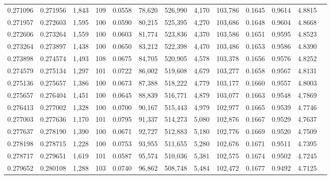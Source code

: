 \begin{tabular}{rrrrrrrrrrrrr}
0.271096 & 0.271956 & 1,843 & 109 &                                     0.0558 &  78,620 & 526,990 &   4,170 & 103,786 & 0.1645 & 0.9614 & 4.8815 \\
0.271957 & 0.272603 & 1,595 & 100 &                                     0.0590 &  80,215 & 525,395 &   4,270 & 103,686 & 0.1648 & 0.9604 & 4.8668 \\
0.272606 & 0.273264 & 1,559 & 100 &                                     0.0603 &  81,774 & 523,836 &   4,370 & 103,586 & 0.1651 & 0.9595 & 4.8523 \\
0.273264 & 0.273897 & 1,438 & 100 &                                     0.0650 &  83,212 & 522,398 &   4,470 & 103,486 & 0.1653 & 0.9586 & 4.8390 \\
0.273898 & 0.274574 & 1,493 & 108 &                                     0.0675 &  84,705 & 520,905 &   4,578 & 103,378 & 0.1656 & 0.9576 & 4.8252 \\
0.274579 & 0.275134 & 1,297 & 101 &                                     0.0722 &  86,002 & 519,608 &   4,679 & 103,277 & 0.1658 & 0.9567 & 4.8131 \\
0.275136 & 0.275657 & 1,386 & 100 &                                     0.0673 &  87,388 & 518,222 &   4,779 & 103,177 & 0.1660 & 0.9557 & 4.8003 \\
0.275657 & 0.276404 & 1,451 & 100 &                                     0.0645 &  88,839 & 516,771 &   4,879 & 103,077 & 0.1663 & 0.9548 & 4.7869 \\
0.276413 & 0.277002 & 1,328 & 100 &                                     0.0700 &  90,167 & 515,443 &   4,979 & 102,977 & 0.1665 & 0.9539 & 4.7746 \\
0.277003 & 0.277636 & 1,170 & 101 &                                     0.0795 &  91,337 & 514,273 &   5,080 & 102,876 & 0.1667 & 0.9529 & 4.7637 \\
0.277637 & 0.278190 & 1,390 & 100 &                                     0.0671 &  92,727 & 512,883 &   5,180 & 102,776 & 0.1669 & 0.9520 & 4.7509 \\
0.278198 & 0.278715 & 1,228 & 100 &                                     0.0753 &  93,955 & 511,655 &   5,280 & 102,676 & 0.1671 & 0.9511 & 4.7395 \\
0.278717 & 0.279651 & 1,619 & 101 &                                     0.0587 &  95,574 & 510,036 &   5,381 & 102,575 & 0.1674 & 0.9502 & 4.7245 \\
0.279652 & 0.280108 & 1,288 & 103 &                                     0.0740 &  96,862 & 508,748 &   5,484 & 102,472 & 0.1677 & 0.9492 & 4.7125 \\

\end{tabular}
